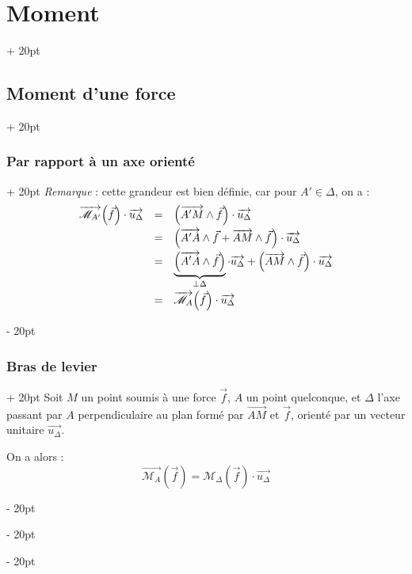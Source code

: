 \documentclass[a4paper, 12pt, twoside]{article}
\newcommand{\vect}{\overrightarrow}
\newcommand{\lr}[1]{\left( #1 \right)}
\newcommand{\ind}[1][20pt]{\advance\leftskip + #1}
\newcommand{\deind}[1][20pt]{\advance\leftskip - #1}
\newenvironment{indt}[2][20pt]{#2 \par \ind[#1]}{\par \deind} %
\begin{document}
\begin{indt}{\section{Moment}}
\begin{indt}{\subsection{Moment d'une force}}
\begin{indt}{\subsubsection{Par rapport à un axe orienté}}
                \textit{Remarque} : cette grandeur est bien définie, car pour $A' \in \Delta$, on a :
                \[
                    \begin{array}{rcl}
                        \vect{\mathscr M_{A'}}\!\lr{\vec f} \cdot \vect{u_\Delta}
                        &=& \lr{\vect{A'M} \wedge \vec f} \cdot \vect{u_\Delta}
                        \vspace{3pt}
                        \\
                        &=& \lr{\vect{A'A} \wedge \vec f + \vect{AM} \wedge \vec f} \cdot \vect{u_\Delta}
                        \vspace{3pt}
                        \\
                        &=& \underbrace{\lr{\vect{A'A} \wedge \vec f}}_{\perp \Delta} \cdot \vect{u_\Delta} + \lr{\vect{AM} \wedge \vec f} \cdot \vect{u_\Delta}
                        \vspace{3pt}
                        \\
                        &=& \vect{\mathscr M_A}\!\lr{\vec f} \cdot \vect{u_\Delta}
                    \end{array}
                \]
            \end{indt}

            \vspace{12pt}
            
            \begin{indt}{\subsubsection{Bras de levier}}
                Soit $M$ un point soumis à une force $\vec f$, $A$ un point quelconque, et $\Delta$ l'axe passant par $A$ perpendiculaire au plan formé par $\vect{AM}$ et $\vec f$, orienté par un vecteur unitaire $\vect{u_\Delta}$.

                \vspace{6pt}
                
                On a alors :
                \[
                    \vect{\mathscr M_A}\!\lr{\vec f} = \mathscr M_\Delta\!\lr{\vec f} \cdot \vect{u_\Delta}
                \]
            \end{indt}
        \end{indt}

        \vspace{12pt}
        

\end{indt}
\end{document}
